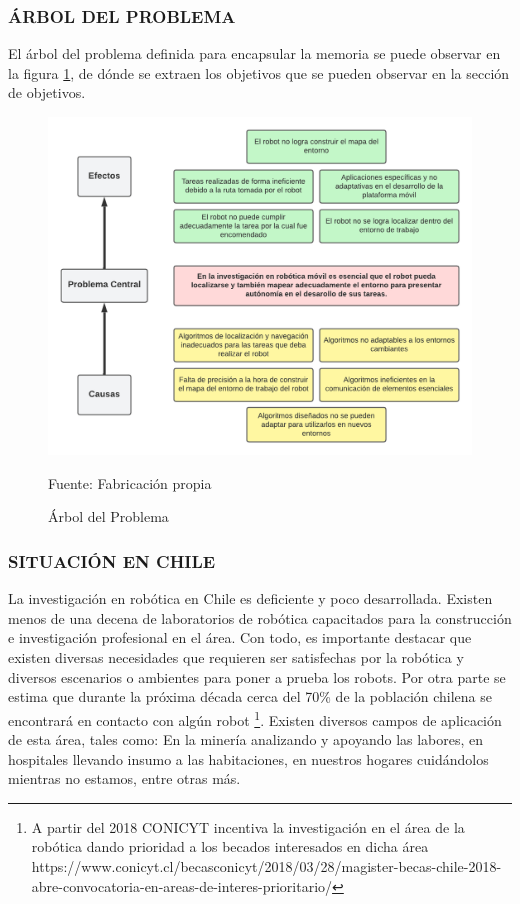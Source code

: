 \subsubsection{ÁRBOL DEL PROBLEMA}

El árbol del problema definida para encapsular la memoria se puede observar en la figura \ref{fig:arbol_del_problema}, de dónde se extraen los objetivos que se pueden observar en la sección de objetivos.
\begin{figure}[h]
\centering
\includegraphics[width=1\textwidth]{figures/01definicion_problema/arbol_del_problema.png}
\caption{\label{fig:arbol_del_problema} Árbol del Problema} Fuente: Fabricación propia
\end{figure}

\subsubsection{SITUACIÓN EN CHILE}

La investigación en robótica en Chile es deficiente y poco desarrollada. Existen menos de una decena de laboratorios de robótica capacitados para la construcción e investigación profesional en el área. Con todo, es importante destacar que existen diversas necesidades que requieren ser satisfechas por la robótica y diversos escenarios o ambientes para poner a prueba los robots. Por otra parte se estima que durante la próxima década cerca del 70\% de la población chilena se encontrará en contacto con algún robot \footnote{A partir del 2018 CONICYT incentiva la investigación en el área de la robótica dando prioridad a los becados interesados en dicha área https://www.conicyt.cl/becasconicyt/2018/03/28/magister-becas-chile-2018-abre-convocatoria-en-areas-de-interes-prioritario/ }. Existen diversos campos de aplicación de esta área, tales como: En la minería analizando y apoyando las labores, en hospitales llevando insumo a las habitaciones, en nuestros hogares cuidándolos mientras no estamos, entre otras más. 

